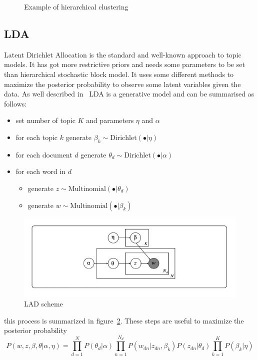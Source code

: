 \begin{figure}[htb!]
\begin{minipage}{0.35\textwidth}
	\end{minipage}
\caption{Example of hierarchical clustering}
\label{fig:topic/hc}
\end{figure}

\subsection{LDA}\label{sec:lda}
Latent Dirichlet Allocation is the standard and well-known approach to topic models. It has got more restrictive priors and needs some parameters to be set than hierarchical stochastic block model. It uses some different methods to maximize the posterior probability to observe some latent variables given the data.
As well described in~\cite{Zhou2016} LDA is a generative model and can be summarised as follows:
\begin{itemize}
	\item set number of topic $K$ and parameters $\eta$ and $\alpha$
	\item for each topic $k$ generate $\beta_k\sim \text{Dirichlet}(\bullet |\eta)$
	\item for each document $d$ generate $\theta_d\sim \text{Dirichlet}(\bullet|\alpha)$
	\item for each word in $d$ 
	\begin{itemize}
		\item generate $z\sim \text{Multinomial}(\bullet|\theta_d)$
		\item generate $w\sim \text{Multinomial}(\bullet|\beta_k)$
	\end{itemize}
\end{itemize}
\begin{figure}[htb!]
	\centering
	\includegraphics[width=0.65\linewidth]{pictures/topic/LDA.jpeg}
	\caption{LAD scheme}
	\label{fig:LDA}
\end{figure}
this process is summarized in figure~\ref{fig:LDA}. These steps are useful to maximize the posterior probability
\begin{equation}\label{eq:lda}
P(w, z,\beta, \theta| \alpha, \eta)=\prod_{d=1}^N P(\theta_d | \alpha)\prod_{n=1}^{N_d} P(w_{dn}|z_{dn},\beta_k)P(z_{dn}|\theta_d)\prod_{k=1}^KP(\beta_k|\eta)
\end{equation}
